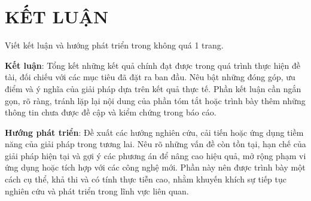 \section*{KẾT LUẬN}
\setcounter{section}{4}
\setcounter{subsection}{0}
\setcounter{figure}{0}
\setcounter{table}{0}

Viết kết luận và hướng phát triển trong không quá 1 trang.

\textbf{Kết luận}: Tổng kết những kết quả chính đạt được trong quá trình thực hiện đề tài, đối chiếu với các mục tiêu đã đặt ra ban đầu. Nêu bật những đóng góp, ưu điểm và ý nghĩa của giải pháp dựa trên kết quả thực tế. Phần kết luận cần ngắn gọn, rõ ràng, tránh lặp lại nội dung của phần tóm tắt hoặc trình bày thêm những thông tin chưa được đề cập và kiểm chứng trong báo cáo.

\textbf{Hướng phát triển}: Đề xuất các hướng nghiên cứu, cải tiến hoặc ứng dụng tiềm năng của giải pháp trong tương lai. Nêu rõ những vấn đề còn tồn tại, hạn chế của giải pháp hiện tại và gợi ý các phương án để nâng cao hiệu quả, mở rộng phạm vi ứng dụng hoặc tích hợp với các công nghệ mới. Phần này nên được trình bày một cách cụ thể, khả thi và có tính thực tiễn cao, nhằm khuyến khích sự tiếp tục nghiên cứu và phát triển trong lĩnh vực liên quan.

\newpage
\cleardoublepage